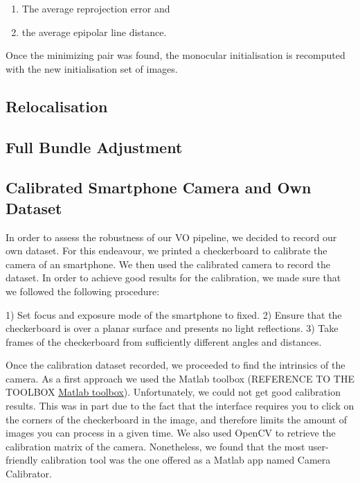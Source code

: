 \begin{enumerate}
\item The average reprojection error and 
\item the average epipolar line distance.
\end{enumerate}

Once the minimizing pair was found, the monocular initialisation is recomputed with the new initialisation set of images.

\subsection{Relocalisation}

\subsection{Full Bundle Adjustment}

\subsection{Calibrated Smartphone Camera and Own Dataset}

In order to assess the robustness of our VO pipeline, we decided to record our own dataset.
For this endeavour, we printed a checkerboard to calibrate the camera of an smartphone.
We then used the calibrated camera to record the dataset.
In order to achieve good results for the calibration, we made sure that we followed the following procedure:

1) Set focus and exposure mode of the smartphone to fixed.
2) Ensure that the checkerboard is over a planar surface and presents no light reflections.
3) Take frames of the checkerboard from sufficiently different angles and distances.

Once the calibration dataset recorded, we proceeded to find the intrinsics of the camera.
As a first approach we used the Matlab toolbox (REFERENCE TO THE TOOLBOX \href{https://www.vision.caltech.edu/bouguetj/calib_doc/}{Matlab toolbox}).
Unfortunately, we could not get good calibration results.
This was in part due to the fact that the interface requires you to click on the
corners of the checkerboard in the image, and therefore limits the amount of images you can process in a given time.
We also used OpenCV to retrieve the calibration matrix of the camera. Nonetheless, we found that the most user-friendly
calibration tool was the one offered as a Matlab app named Camera Calibrator.

